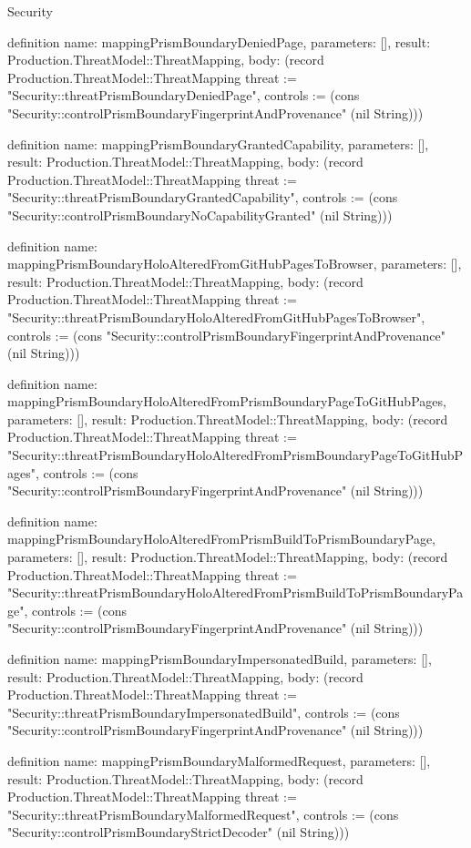 \begin{lexlean}{Security}
\begin{semanticmodule}
definition{
  name: mappingPrismBoundaryDeniedPage,
  parameters: [],
  result: Production.ThreatModel::ThreatMapping,
  body: (record Production.ThreatModel::ThreatMapping {threat := "Security::threatPrismBoundaryDeniedPage", controls := (cons "Security::controlPrismBoundaryFingerprintAndProvenance" (nil String))})
}

definition{
  name: mappingPrismBoundaryGrantedCapability,
  parameters: [],
  result: Production.ThreatModel::ThreatMapping,
  body: (record Production.ThreatModel::ThreatMapping {threat := "Security::threatPrismBoundaryGrantedCapability", controls := (cons "Security::controlPrismBoundaryNoCapabilityGranted" (nil String))})
}

definition{
  name: mappingPrismBoundaryHoloAlteredFromGitHubPagesToBrowser,
  parameters: [],
  result: Production.ThreatModel::ThreatMapping,
  body: (record Production.ThreatModel::ThreatMapping {threat := "Security::threatPrismBoundaryHoloAlteredFromGitHubPagesToBrowser", controls := (cons "Security::controlPrismBoundaryFingerprintAndProvenance" (nil String))})
}

definition{
  name: mappingPrismBoundaryHoloAlteredFromPrismBoundaryPageToGitHubPages,
  parameters: [],
  result: Production.ThreatModel::ThreatMapping,
  body: (record Production.ThreatModel::ThreatMapping {threat := "Security::threatPrismBoundaryHoloAlteredFromPrismBoundaryPageToGitHubPages", controls := (cons "Security::controlPrismBoundaryFingerprintAndProvenance" (nil String))})
}

definition{
  name: mappingPrismBoundaryHoloAlteredFromPrismBuildToPrismBoundaryPage,
  parameters: [],
  result: Production.ThreatModel::ThreatMapping,
  body: (record Production.ThreatModel::ThreatMapping {threat := "Security::threatPrismBoundaryHoloAlteredFromPrismBuildToPrismBoundaryPage", controls := (cons "Security::controlPrismBoundaryFingerprintAndProvenance" (nil String))})
}

definition{
  name: mappingPrismBoundaryImpersonatedBuild,
  parameters: [],
  result: Production.ThreatModel::ThreatMapping,
  body: (record Production.ThreatModel::ThreatMapping {threat := "Security::threatPrismBoundaryImpersonatedBuild", controls := (cons "Security::controlPrismBoundaryFingerprintAndProvenance" (nil String))})
}

definition{
  name: mappingPrismBoundaryMalformedRequest,
  parameters: [],
  result: Production.ThreatModel::ThreatMapping,
  body: (record Production.ThreatModel::ThreatMapping {threat := "Security::threatPrismBoundaryMalformedRequest", controls := (cons "Security::controlPrismBoundaryStrictDecoder" (nil String))})
}


\end{semanticmodule}
\end{lexlean}
